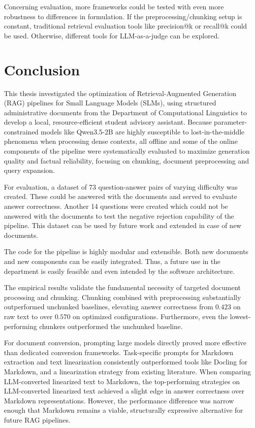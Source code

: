 \documentclass[12pt]{article} %
\begin{document}
Concerning evaluation, more frameworks could be tested with even more robustness to differences in formulation. If the preprocessing/chunking setup is constant, traditional retrieval evaluation tools like precision@k or recall@k could be used. Otherwise, different tools for LLM-as-a-judge can be explored.



\section{Conclusion}
This thesis investigated the optimization of Retrieval-Augmented Generation (RAG) pipelines for Small Language Models (SLMs), using structured administrative documents from the Department of Computational Linguistics to develop a local, resource-efficient student advisory assistant. Because parameter-constrained models like Qwen3.5-2B are highly susceptible to lost-in-the-middle phenomena when processing dense contexts, all offline and some of the online components of the pipeline were systematically evaluated to maximize generation quality and factual reliability, focusing on chunking, document preprocessing and query expansion.

For evaluation, a dataset of 73 question-answer pairs of varying difficulty was created. These could be answered with the documents and served to evaluate answer correctness. Another 14 questions were created which could not be answered with the documents to test the negative rejection capability of the pipeline. This dataset can be used by future work and extended in case of new documents.

The code for the pipeline is highly modular and extensible. Both new documents and new components can be easily integrated. Thus, a future use in the department is easily feasible and even intended by the software architecture.

The empirical results validate the fundamental necessity of targeted document processing and chunking. Chunking combined with preprocessing substantially outperformed unchunked baselines, elevating answer correctness from $0.423$ on raw text to over $0.570$ on optimized configurations. Furthermore, even the lowest-performing chunkers outperformed the unchunked baseline.

For document conversion, prompting large models directly proved more effective than dedicated conversion frameworks. Task-specific prompts for Markdown extraction and text linearization consistently outperformed tools like Docling for Markdown, and a linearization strategy from existing literature. When comparing LLM-converted linearized text to Markdown, the top-performing strategies on LLM-converted linearized text achieved a slight edge in answer correctness over Markdown representations. However, the performance difference was narrow enough that Markdown remains a viable, structurally expressive alternative for future RAG pipelines.
\end{document}
